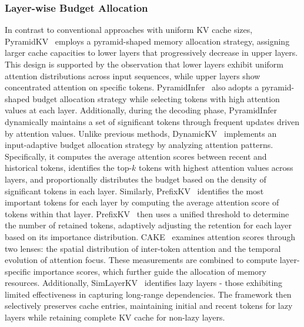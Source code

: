 \subsubsection{Layer-wise Budget Allocation}\label{sssec:kv_budget_layer_wise}
In contrast to conventional approaches with uniform KV cache sizes, PyramidKV~\cite{DBLP:journals/corr/abs-2406-02069} employs a 
pyramid-shaped memory allocation strategy, assigning larger cache capacities to lower layers that progressively decrease 
in upper layers. This design is supported by the observation that lower layers exhibit uniform attention distributions 
across input sequences, while upper layers show concentrated attention on specific tokens.
PyramidInfer~\cite{DBLP:conf/acl/YangHGHZ024} also adopts a pyramid-shaped budget allocation strategy while selecting tokens 
with high attention values at each layer. Additionally, during the decoding phase, PyramidInfer dynamically maintains a set of 
significant tokens through frequent updates driven by attention values. 
Unlike previous methods, DynamicKV~\cite{anonymous2024dynamickv} implements an input-adaptive budget allocation strategy by analyzing attention 
patterns. Specifically, it computes the average attention scores between recent and historical tokens, 
identifies the top-$k$ tokens with highest attention values across layers, and proportionally distributes 
the budget based on the density of significant tokens in each layer.
Similarly,
PrefixKV~\cite{wang2024prefixkvadaptiveprefixkv} identifies the most important tokens for each layer by computing the average attention score of tokens within that layer. 
PrefixKV~\cite{wang2024prefixkvadaptiveprefixkv} then uses a unified threshold to determine the number of retained tokens, adaptively adjusting the retention for each layer based on its importance distribution.
CAKE~\cite{anonymous2024cake} examines attention scores through two lenses: the spatial distribution of 
inter-token attention and the temporal evolution of attention focus. These measurements are combined to 
compute layer-specific importance scores, which further guide the allocation of memory resources.
Additionally, SimLayerKV~\cite{DBLP:journals/corr/abs-2410-13846} identifies lazy layers - 
those exhibiting limited effectiveness in capturing long-range dependencies. 
The framework then selectively preserves cache entries, maintaining  initial and recent tokens 
for lazy layers while retaining complete KV cache for non-lazy layers.



